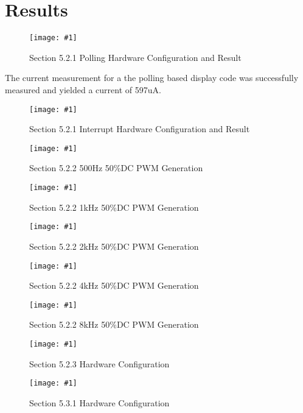 \documentclass[journal]{IEEEtran}
\newcommand\createfigure[2]{
  \begin{figure}[H]
    \centering \texttt{[image: \#1]}
    \caption{#2}
  \end{figure}}
\begin{document}
\section{Results}
\createfigure{./Figures/5.2.1-Polling.jpg}{Section 5.2.1 Polling Hardware Configuration and Result}
The current measurement for a the polling based display code was successfully measured and yielded a current of 597uA.
\createfigure{./Figures/5.2.1-Interrupt.jpg}{Section 5.2.1 Interrupt Hardware Configuration and Result}
\createfigure{./Figures/5.2.2-500Hz.jpg}{Section 5.2.2 500\si{Hz} 50\%DC PWM Generation}
\createfigure{./Figures/5.2.2-1kHz.jpg}{Section 5.2.2 1\si{kHz} 50\%DC PWM Generation}
\createfigure{./Figures/5.2.2-2kHz.jpg}{Section 5.2.2 2\si{kHz} 50\%DC PWM Generation}
\createfigure{./Figures/5.2.2-4kHz.jpg}{Section 5.2.2 4\si{kHz} 50\%DC PWM Generation}
\createfigure{./Figures/5.2.2-8kHz.jpg}{Section 5.2.2 8\si{kHz} 50\%DC PWM Generation}
\createfigure{./Figures/5.2.3-Setup.jpg}{Section 5.2.3 Hardware Configuration}
\createfigure{./Figures/5.3.1-Setup.jpg}{Section 5.3.1 Hardware Configuration}
\nocite{rojasEmbeddedSystemsDesign2016}
\nocite{LCDControllerDatasheets}


\end{document}
